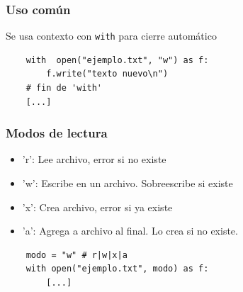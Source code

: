 \documentclass[14pt,aspectratio=169,xcolor=dvipsnames]{beamer}
\begin{document}
\begin{frame}[fragile]\frametitle{Uso común}
    Se usa contexto con {\color{purple}\texttt{with}} para cierre automático
    \begin{verbatim}
    with  open("ejemplo.txt", "w") as f:
        f.write("texto nuevo\n") 
    # fin de 'with'
    [...]
    \end{verbatim}
\end{frame}
\begin{frame}[fragile]\frametitle{Modos de lectura}
    \begin{itemize}
        \item 'r': Lee archivo, error si no existe
        \item 'w': Escribe en un archivo. Sobreescribe si existe
        \item 'x': Crea archivo, error si ya existe
        \item 'a': Agrega a archivo al final. Lo crea si no existe.

    \end{itemize}
    
    \vspace{1cm}
    \begin{verbatim}
    modo = "w" # r|w|x|a
    with open("ejemplo.txt", modo) as f:
        [...]
    \end{verbatim}
\end{frame}
\begin{frame}


\end{frame}
\end{document}
